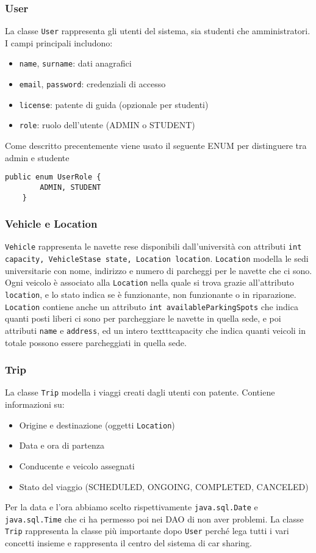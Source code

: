 \subsubsection{User}
La classe \texttt{User} rappresenta gli utenti del sistema, sia studenti che amministratori. I campi principali includono:
\begin{itemize}
\item \texttt{name}, \texttt{surname}: dati anagrafici
\item \texttt{email}, \texttt{password}: credenziali di accesso
\item \texttt{license}: patente di guida (opzionale per studenti)
\item \texttt{role}: ruolo dell'utente (ADMIN o STUDENT)
\end{itemize}
Come descritto precentemente viene usato il seguente ENUM per distinguere tra admin e studente
\begin{lstlisting}[style=java, caption={UserRole ENUM}]
public enum UserRole {
        ADMIN, STUDENT 
    }
\end{lstlisting}

\subsubsection{Vehicle e Location}
\texttt{Vehicle} rappresenta le navette rese disponibili dall'università con attributi \texttt{int capacity, VehicleStase state, Location location}. \texttt{Location} modella le sedi universitarie con nome, indirizzo e numero di parcheggi per le navette che ci sono.
Ogni veicolo è associato alla \texttt{Location} nella quale si trova grazie all'attributo \texttt{location}, e lo stato indica se è funzionante, non funzionante o in riparazione.\\
\texttt{Location} contiene anche un attributo \texttt{int availableParkingSpots} che indica quanti posti liberi ci sono per parcheggiare le navette in quella sede, e poi attributi \texttt{name} e \texttt{address}, ed un intero texttt{capacity} che indica quanti veicoli in totale possono essere parcheggiati in quella sede.
\subsubsection{Trip}
La classe \texttt{Trip} modella i viaggi creati dagli utenti con patente. Contiene informazioni su:
\begin{itemize}
\item Origine e destinazione (oggetti \texttt{Location})
\item Data e ora di partenza
\item Conducente e veicolo assegnati
\item Stato del viaggio (SCHEDULED, ONGOING, COMPLETED, CANCELED)
\end{itemize}
Per la data e l'ora abbiamo scelto rispettivamente \texttt{java.sql.Date} e \texttt{java.sql.Time} che ci ha permesso poi nei DAO di non aver problemi.
La classe \texttt{Trip} rappresenta la classe più importante dopo \texttt{User} perché lega tutti i vari concetti insieme e rappresenta il centro del sistema di car sharing.

